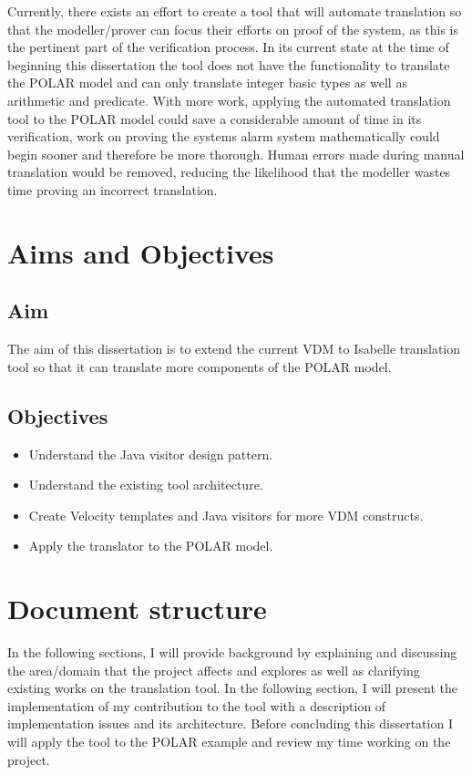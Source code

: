Currently, there exists an effort to create a tool that will automate translation so that the modeller/prover can focus their efforts on proof of the system, as this is the pertinent part of the verification process\parencite{VDM2ISAGit}. In its current state at the time of beginning this dissertation the tool does not have the functionality to translate the POLAR model and can only translate integer basic types as well as arithmetic and predicate. With more work, applying the automated translation tool to the POLAR model could save a considerable amount of time in its verification, work on proving the systems alarm system mathematically could begin sooner and therefore be more thorough. Human errors made during manual translation would be removed, reducing the likelihood that the modeller wastes time proving an incorrect translation.

\section{Aims and Objectives}
\subsection{Aim}
The aim of this dissertation is to extend the current VDM to Isabelle translation tool so that it can translate more components of the POLAR model.
\subsection{Objectives}
\begin{itemize}
	\item Understand the Java visitor design pattern.
	\item Understand the existing tool architecture.
	\item Create Velocity templates and Java visitors for more VDM constructs.
	\item Apply the translator to the POLAR model.
\end{itemize}

\section{Document structure}
In the following sections, I will provide background by explaining and discussing the area/domain that the project affects and explores as well as clarifying existing works on the translation tool. In the following section, I will present the implementation of my contribution to the tool with a description of implementation issues and its architecture. Before concluding this dissertation I will apply the tool to the POLAR example and review my time working on the project.
